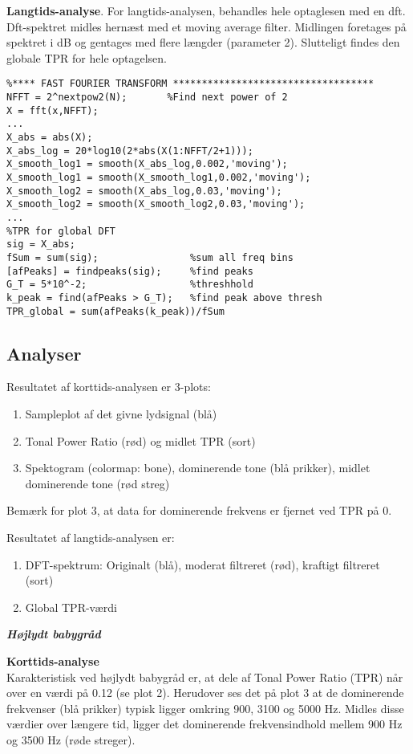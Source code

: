 \textbf{Langtids-analyse}. For langtids-analysen, behandles hele optaglesen med en dft. Dft-spektret midles hernæst med et moving average filter. Midlingen foretages på spektret i dB og gentages med flere længder (parameter 2). Slutteligt findes den globale TPR for hele optagelsen. 

\begin{verbatim}%**** FAST FOURIER TRANSFORM *********************************** 
NFFT = 2^nextpow2(N);       %Find next power of 2
X = fft(x,NFFT);
...
X_abs = abs(X);
X_abs_log = 20*log10(2*abs(X(1:NFFT/2+1)));
X_smooth_log1 = smooth(X_abs_log,0.002,'moving');
X_smooth_log1 = smooth(X_smooth_log1,0.002,'moving'); 
X_smooth_log2 = smooth(X_abs_log,0.03,'moving');       
X_smooth_log2 = smooth(X_smooth_log2,0.03,'moving');
...
%TPR for global DFT
sig = X_abs;
fSum = sum(sig);                %sum all freq bins
[afPeaks] = findpeaks(sig);     %find peaks
G_T = 5*10^-2;                  %threshhold
k_peak = find(afPeaks > G_T);   %find peak above thresh
TPR_global = sum(afPeaks(k_peak))/fSum 
\end{verbatim}

\newpage
\subsection*{Analyser}
Resultatet af korttids-analysen er 3-plots:
\begin{enumerate}
	\item Sampleplot af det givne lydsignal (blå)
	\item Tonal Power Ratio (rød) og midlet TPR (sort)
	\item Spektogram (colormap: bone), dominerende tone (blå prikker), midlet dominerende tone (rød streg)
\end{enumerate}
Bemærk for plot 3, at data for dominerende frekvens er fjernet ved TPR på 0.

Resultatet af langtids-analysen er:
\begin{enumerate}
	\item DFT-spektrum: Originalt (blå), moderat filtreret (rød), kraftigt filtreret (sort)
	\item Global TPR-værdi
\end{enumerate}

\newpage
\begin{center}  \textit{\textbf{Højlydt babygråd}}  \end{center}
\textbf{Korttids-analyse} \\
Karakteristisk ved højlydt babygråd er, at dele af Tonal Power Ratio (TPR) når over en værdi på 0.12 (se plot 2). Herudover ses det på plot 3 at de dominerende frekvenser (blå prikker) typisk ligger omkring 900, 3100 og 5000 Hz. Midles disse værdier over længere tid, ligger det dominerende frekvensindhold mellem 900 Hz og 3500 Hz (røde streger). 

